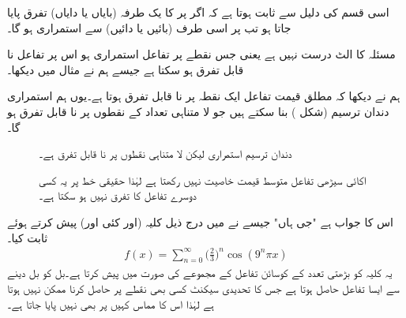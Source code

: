 اسی قسم کی دلیل سے ثابت ہوتا ہے کہ اگر  پر  کا یک طرفہ (بایاں یا دایاں) تفرق پایا جاتا ہو تب  پر  اسی طرف (بائیں یا دائیں) سے استمراری ہو گا۔

\quad مسئلہ  کا الٹ درست نہیں ہے یعنی جس نقطے پر تفاعل استمراری ہو اس پر تفاعل نا قابل تفرق ہو سکتا ہے جیسے ہم نے مثال  میں دیکھا۔

 ہم نے دیکھا کہ مطلق قیمت تفاعل  ایک نقطہ پر نا قابل تفرق ہوتا ہے۔یوں ہم استمراری دندان ترسیم (شکل ) بنا سکتے ہیں جو لا متناہی تعداد کے نقطوں پر نا قابل تفرق ہو گا۔
\begin{figure}
\centering
\begin{minipage}{0.45\textwidth}
\centering
{}
\caption{دندان ترسیم استمراری لیکن لا متناہی نقطوں پر نا قابل تفرق ہے۔}
\label{شکل_تفرق_دندان_ترسیم}
\end{minipage}\hfill
\begin{minipage}{0.45\textwidth}
\centering
{}
\caption{اکائی سیڑھی تفاعل متوسط قیمت خاصیت نہیں رکھتا ہے لہٰذا حقیقی خط پر یہ کسی دوسرے تفاعل کا تفرق نہیں ہو سکتا ہے۔}
\label{شکل_تفرق_اکائی_سیڑھی_تفاعل}
\end{minipage}
\end{figure}

 اس کا جواب ہے "جی ہاں" جیسے   نے  میں درج ذیل کلیہ (اور کئی اور) پیش کرتے ہوئے ثابت کیا۔
\begin{align*}
f(x)=\sum_{n=0}^{\infty}\big(\frac{2}{3}\big)^n\cos (9^n\pi x)
\end{align*}
یہ کلیہ  کو  بڑھتی تعدد کے کوسائن تفاعل کے مجموعے کی صورت میں پیش کرتا ہے۔بل کو بل دینے سے ایسا تفاعل حاصل ہوتا ہے جس کا تحدیدی سیکنٹ کسی بھی نقطے پر حاصل کرنا ممکن نہیں ہوتا ہے لہٰذا اس کا مماس کہیں پر بھی نہیں پایا جاتا ہے۔ 

